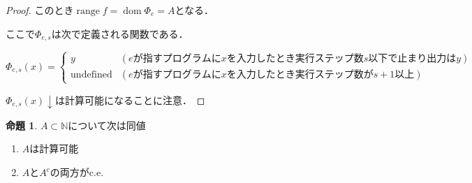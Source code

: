 \documentclass[uplatex]{jsarticle}
\newcommand{\N}{\mathbb{N}}
\newcommand{\range}{\operatorname{range}}
\newcommand{\dom}{\operatorname{dom}}
\theoremstyle{definition} %
\newtheorem{prop}[thm]{命題}
\begin{document}
\begin{proof}
このとき$\range f = \dom \Phi_e = A$となる．

ここで$\Phi_{e,s}$は次で定義される関数である．

\[
\Phi_{e,s}(x) = \begin{cases}
y & (eが指すプログラムにxを入力したとき実行ステップ数s以下で止まり出力はy) \\
\mathrm{undefined} & (eが指すプログラムにxを入力したとき実行ステップ数がs+1以上)
\end{cases}
\]

$\Phi_{e,s}(x)\downarrow$は計算可能になることに注意．
\end{proof}


\begin{prop}
$A \subset \N$について次は同値

\begin{enumerate}
\item $A$は計算可能
\item $A$と$A^c$の両方がc.e.
\end{enumerate}
\end{prop}
\end{document}

